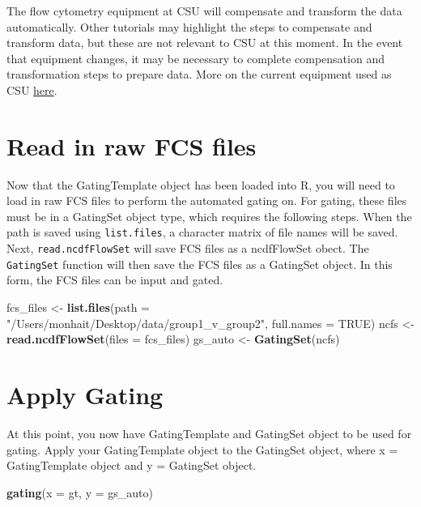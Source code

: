 \documentclass[]{book}
\newenvironment{Shaded}{\begin{snugshade}}{\end{snugshade}}
\newcommand{\DataTypeTok}[1]{\textcolor[rgb]{0.13,0.29,0.53}{#1}}
\newcommand{\KeywordTok}[1]{\textcolor[rgb]{0.13,0.29,0.53}{\textbf{#1}}}
\newcommand{\NormalTok}[1]{#1}
\newcommand{\OtherTok}[1]{\textcolor[rgb]{0.56,0.35,0.01}{#1}}
\newcommand{\StringTok}[1]{\textcolor[rgb]{0.31,0.60,0.02}{#1}}
\begin{document}
The flow cytometry equipment at CSU will compensate and transform the data automatically. Other tutorials may highlight the steps to compensate and transform data, but these are not relevant to CSU at this moment. In the event that equipment changes, it may be necessary to complete compensation and transformation steps to prepare data. More on the current equipment used as CSU \href{https://www.umassmed.edu/facslab/instrument/core-cytek-aurora2/}{here}.

\hypertarget{read-in-raw-fcs-files}{%
\section{Read in raw FCS files}\label{read-in-raw-fcs-files}}

Now that the GatingTemplate object has been loaded into R, you will need to load in raw FCS files to perform the automated gating on. For gating, these files must be in a GatingSet object type, which requires the following steps. When the path is saved using \texttt{list.files}, a character matrix of file names will be saved. Next, \texttt{read.ncdfFlowSet} will save FCS files as a ncdfFlowSet obect. The \texttt{GatingSet} function will then save the FCS files as a GatingSet object. In this form, the FCS files can be input and gated.

\begin{Shaded}
\begin{Highlighting}[]
\NormalTok{fcs_files <-}\StringTok{ }\KeywordTok{list.files}\NormalTok{(}\DataTypeTok{path =} \StringTok{"/Users/monhait/Desktop/data/group1_v_group2"}\NormalTok{, }\DataTypeTok{full.names =} \OtherTok{TRUE}\NormalTok{)}
\NormalTok{ncfs  <-}\StringTok{ }\KeywordTok{read.ncdfFlowSet}\NormalTok{(}\DataTypeTok{files =}\NormalTok{ fcs_files)}
\NormalTok{gs_auto <-}\StringTok{ }\KeywordTok{GatingSet}\NormalTok{(ncfs)}
\end{Highlighting}
\end{Shaded}

\hypertarget{apply-gating}{%
\section{Apply Gating}\label{apply-gating}}

At this point, you now have GatingTemplate and GatingSet object to be used for gating. Apply your GatingTemplate object to the GatingSet object, where x = GatingTemplate object and y = GatingSet object.

\begin{Shaded}
\begin{Highlighting}[]
\KeywordTok{gating}\NormalTok{(}\DataTypeTok{x =}\NormalTok{ gt, }\DataTypeTok{y =}\NormalTok{ gs_auto)}
\end{Highlighting}
\end{Shaded}
\end{document}
